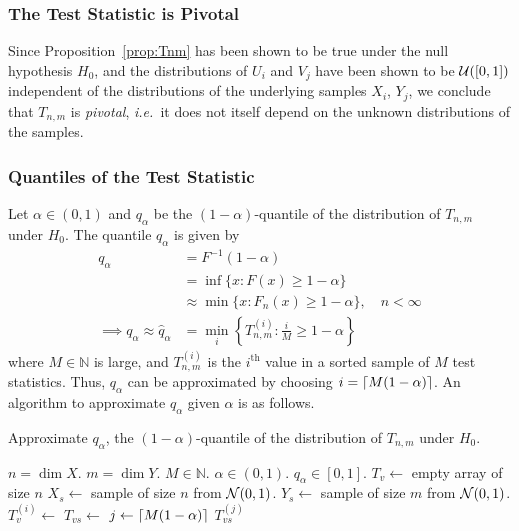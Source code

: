 \documentclass[letterpaper, reqno]{amsart}
\numberwithin{equation}{section}
\DeclarePairedDelimiter{\ceil}{\lceil}{\rceil}
\newcommand{\ie}{\emph{i.e.\ }}
\newcommand{\N}[2]{\mathcal{N}\mleft( #1, #2 \mright)}
\newcommand{\U}[2]{\mathcal{U}\mleft(\mleft[ #1, #2 \mright]\mright)}
\begin{document}
\subsubsection{The Test Statistic is Pivotal}
Since Proposition~\ref{prop:Tnm} has been shown to be true under the null hypothesis $H_0$, and the distributions of $U_i$
and $V_j$ have been shown to be $\U{0}{1}$ independent of the distributions of
the underlying samples $X_i$, $Y_j$, we conclude that $T_{n,m}$ is
\emph{pivotal}, \ie it does not itself depend on the unknown distributions of
the samples.

\clearpage
\subsubsection{Quantiles of the Test Statistic}
Let $\alpha \in (0, 1)$ and $q_\alpha$ be the $(1 - \alpha)$-quantile of the
distribution of $T_{n,m}$ under $H_0$. The quantile $q_\alpha$ is given by
\begin{align*}
  q_\alpha &= F^{-1}(1-\alpha) \\
           &= \inf\{x \colon F(x) \ge 1 - \alpha\} \\
           &\approx \min\{x \colon F_n(x) \ge 1 - \alpha\}, \quad n < \infty \\
           \implies q_\alpha \approx \hat{q}_\alpha &= \min_i \left\{
               T_{n,m}^{(i)} \colon \tfrac{i}{M} \ge 1 - \alpha \right\}
\end{align*}
where $M \in \mathbb{N}$ is large, and $T_{n,m}^{(i)}$ is the $i^\text{th}$
value in a sorted sample of $M$ test statistics. Thus, $q_\alpha$ can be
approximated by choosing $i = \ceil{M(1 - \alpha)}$. An algorithm to approximate
$q_\alpha$ given $\alpha$ is as follows.

\begin{algorithm}[H]
  \caption{Approximate $q_\alpha$, the $(1 - \alpha)$-quantile of the
distribution of $T_{n,m}$ under $H_0$.}
  \label{alg:ks_q}
  \begin{algorithmic}
    \Require $n = \dim X$. $m = \dim Y$. $M \in \mathbb{N}$. $\alpha
    \in (0, 1)$.
    \Ensure $q_\alpha \in [0, 1]$.
      \State $T_v \gets$ empty array of size $n$
        \State $X_s \gets$ sample of size $n$ from $\N{0}{1}$.
        \State $Y_s \gets$ sample of size $m$ from $\N{0}{1}$.
        \State $T_v^{(i)} \gets$  
      \EndFor
      \State $T_{vs} \gets$ 
      \State $j \gets \ceil*{M(1 - \alpha)}$
      \State \Return $T_{vs}^{(j)}$
    \EndProcedure
  \end{algorithmic}
\end{algorithm}
\end{document}
